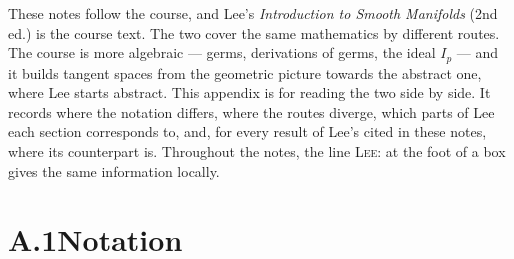 \documentclass[11pt]{report}
\begin{document}
These notes follow the course, and Lee's \emph{Introduction to Smooth Manifolds} (2nd ed.) is the course text. The two cover the same mathematics by different routes. The course is more algebraic --- germs, derivations of germs, the ideal $I_p$ --- and it builds tangent spaces from the geometric picture towards the abstract one, where Lee starts abstract. This appendix is for reading the two side by side. It records where the notation differs, where the routes diverge, which parts of Lee each section corresponds to, and, for every result of Lee's cited in these notes, where its counterpart is. Throughout the notes, the line \textsc{Lee}: at the foot of a box gives the same information locally.

\section*{A.1\quad Notation}
\end{document}
